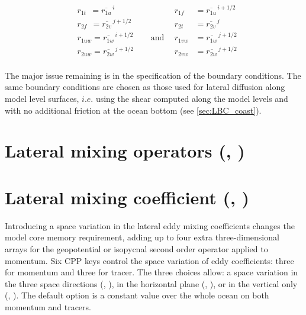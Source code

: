 \documentclass[../main/NEMO_manual]{subfiles}
\begin{document}
\[
  \begin{aligned}
    &r_{1t}\ \ = \overline{r_{1u}}^{\,i}       &&&    r_{1f}\ \ &= \overline{r_{1u}}^{\,i+1/2} \\
    &r_{2f} \ \ = \overline{r_{2v}}^{\,j+1/2} &&& 	r_{2t}\ &= \overline{r_{2v}}^{\,j} \\
    &r_{1uw}  = \overline{r_{1w}}^{\,i+1/2} &&\ \ \text{and} \ \ &   r_{1vw}&= \overline{r_{1w}}^{\,j+1/2} \\
    &r_{2uw}= \overline{r_{2w}}^{\,j+1/2} &&&         r_{2vw}&= \overline{r_{2w}}^{\,j+1/2}\\
  \end{aligned}
\]

The major issue remaining is in the specification of the boundary conditions.
The same boundary conditions are chosen as those used for lateral diffusion along model level surfaces,
$i.e.$ using the shear computed along the model levels and with no additional friction at the ocean bottom
(see \autoref{sec:LBC_coast}).


\section{Lateral mixing operators (\protect{}, \protect{}) }
\label{sec:LDF_op}


   
\section{Lateral mixing coefficient (\protect{}, \protect{}) }
\label{sec:LDF_coef}

Introducing a space variation in the lateral eddy mixing coefficients changes the model core memory requirement,
adding up to four extra three-dimensional arrays for the geopotential or isopycnal second order operator applied to 
momentum.
Six CPP keys control the space variation of eddy coefficients: three for momentum and three for tracer.
The three choices allow:
a space variation in the three space directions (,  ),
in the horizontal plane (,  ),
or in the vertical only (,  ).
The default option is a constant value over the whole ocean on both momentum and tracers. 
   
\end{document}
